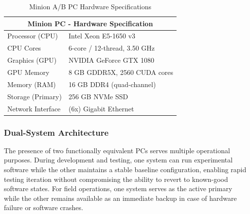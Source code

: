 \begin{table}[htpb]
\centering
\caption{Minion A/B PC Hardware Specifications}
\begin{tabular}{ll}
\hline
\multicolumn{2}{c}{Minion PC - Hardware Specification} \\
\hline
\hline
Processor (CPU) & Intel Xeon E5-1650 v3 \\
CPU Cores & 6-core / 12-thread, 3.50 GHz \\
Graphics (GPU) & NVIDIA GeForce GTX 1080 \\
GPU Memory & 8 GB GDDR5X, 2560 CUDA cores \\
Memory (RAM) & 16 GB DDR4 (quad-channel) \\
Storage (Primary) & 256 GB NVMe SSD \\
Network Interface & (6x) Gigabit Ethernet \\%
\hline
\end{tabular}
\label{table:Minion_hardware}
\end{table}

\subsubsection{Dual-System Architecture}

The presence of two functionally equivalent PCs serves multiple operational purposes.
During development and testing, one system can run experimental software while the other maintains a stable baseline configuration, enabling rapid testing iteration without compromising the ability to revert to known-good software states.
For field operations, one system serves as the active primary while the other remains available as an immediate backup in case of hardware failure or software crashes.

